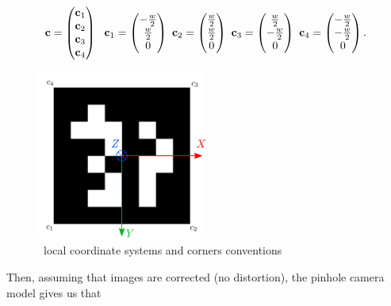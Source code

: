 \begin{equation}
    {\bf c} =
    \begin{pmatrix}
    {\bf c}_1 \\ {\bf c}_2 \\ {\bf c}_3 \\ {\bf c}_4
    \end{pmatrix}
    ~~
    {\bf c}_1 =  \begin{pmatrix} -\frac{w}{2} \\ \frac{w}{2} \\ 0 \end{pmatrix}
    ~ 
    {\bf c}_2 =  \begin{pmatrix} \frac{w}{2} \\ \frac{w}{2} \\ 0 \end{pmatrix}
    ~
    {\bf c}_3 =  \begin{pmatrix} \frac{w}{2} \\ -\frac{w}{2} \\ 0 \end{pmatrix}
    ~
    {\bf c}_4 =  \begin{pmatrix} -\frac{w}{2} \\ -\frac{w}{2} \\ 0 \end{pmatrix}.
\end{equation}

%
\begin{figure}
    \centering
    \includegraphics[width=0.5\textwidth]{figures/tag12_frame.pdf}
    \caption{\apriltag~local coordinate systems and corners conventions \cite{wang2016iros}}
    \label{fig:apriltag_coordinate_frame}
\end{figure}

Then, assuming that images are corrected (no distortion), the pinhole camera model gives us that

